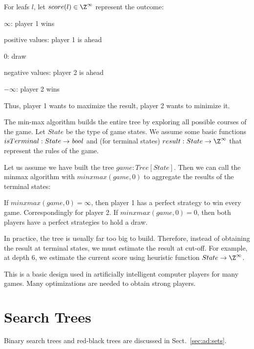 For leafs $l$, let $score(l)\in\Z^\infty$ represent the outcome:
\begin{compactitem}
 \item $\infty$: player 1 wins
 \item positive values: player 1 is ahead
 \item $0$: draw
 \item negative values: player 2 is ahead
 \item $-\infty$: player 2 wins
\end{compactitem}
Thus, player 1 wants to maximize the result, player 2 wants to minimize it.

The min-max algorithm builds the entire tree by exploring all possible courses of the game.
Let $State$ be the type of game states.
We assume some basic functions $isTerminal:State\to\mathit{bool}$ and (for terminal states) $result:State\to\Z^\infty$ that represent the rules of the game.

Let us assume we have built the tree $game:Tree[State]$.
Then we can call the minmax algorithm with $minxmax(game,0)$ to aggregate the results of the terminal states:

\begin{acode}
\end{acode}

If $minxmax(game,0)=\infty$, then player 1 has a perfect strategy to win every game.
Correspondingly for player 2.
If $minxmax(game,0)=0$, then both players have a perfect strategies to hold a draw.

In practice, the tree is usually far too big to build.
Therefore, instead of obtaining the result at terminal states, we must estimate the result at cut-off.
For example, at depth $6$, we estimate the current score using heuristic function $State\to\Z^\infty$.

This is a basic design used in artificially intelligent computer players for many games.
Many optimizations are needed to obtain strong players.

\section{Search Trees}

Binary search trees and red-black trees are discussed in Sect.~\ref{sec:ad:sets}.


